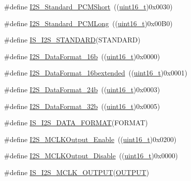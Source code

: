 \begin{DoxyCompactItemize}
\item 
\#define \hyperlink{group___i2_s___standard_gaaf59e587048ff632037dfc9875ab4c7b}{I2\+S\+\_\+\+Standard\+\_\+\+P\+C\+M\+Short}~((\hyperlink{_p_e___types_8h_a1f1825b69244eb3ad2c7165ddc99c956}{uint16\+\_\+t})0x0030)
\item 
\#define \hyperlink{group___i2_s___standard_gaf79cb88702059506d876dbd776d7a136}{I2\+S\+\_\+\+Standard\+\_\+\+P\+C\+M\+Long}~((\hyperlink{_p_e___types_8h_a1f1825b69244eb3ad2c7165ddc99c956}{uint16\+\_\+t})0x00\+B0)
\item 
\#define \hyperlink{group___i2_s___standard_ga826b9ddb34520b8fa64c2b65c9bfd528}{I\+S\+\_\+\+I2\+S\+\_\+\+S\+T\+A\+N\+D\+A\+RD}(S\+T\+A\+N\+D\+A\+RD)
\item 
\#define \hyperlink{group___i2_s___data___format_gabcd7cb799b68346a735709cc135bd414}{I2\+S\+\_\+\+Data\+Format\+\_\+16b}~((\hyperlink{_p_e___types_8h_a1f1825b69244eb3ad2c7165ddc99c956}{uint16\+\_\+t})0x0000)
\item 
\#define \hyperlink{group___i2_s___data___format_gae44b9704c9e393d5abec9bf4fcfe1116}{I2\+S\+\_\+\+Data\+Format\+\_\+16bextended}~((\hyperlink{_p_e___types_8h_a1f1825b69244eb3ad2c7165ddc99c956}{uint16\+\_\+t})0x0001)
\item 
\#define \hyperlink{group___i2_s___data___format_ga5a959486671cf00c5a734f1df205581b}{I2\+S\+\_\+\+Data\+Format\+\_\+24b}~((\hyperlink{_p_e___types_8h_a1f1825b69244eb3ad2c7165ddc99c956}{uint16\+\_\+t})0x0003)
\item 
\#define \hyperlink{group___i2_s___data___format_ga6be3bdcc713cb92a9ad247de013a5e37}{I2\+S\+\_\+\+Data\+Format\+\_\+32b}~((\hyperlink{_p_e___types_8h_a1f1825b69244eb3ad2c7165ddc99c956}{uint16\+\_\+t})0x0005)
\item 
\#define \hyperlink{group___i2_s___data___format_gac467da829eca4a5c4ce41a6abd2d8e81}{I\+S\+\_\+\+I2\+S\+\_\+\+D\+A\+T\+A\+\_\+\+F\+O\+R\+M\+AT}(F\+O\+R\+M\+AT)
\item 
\#define \hyperlink{group___i2_s___m_c_l_k___output_ga99713ee8c824f4d3bb25a9ce7bf5312a}{I2\+S\+\_\+\+M\+C\+L\+K\+Output\+\_\+\+Enable}~((\hyperlink{_p_e___types_8h_a1f1825b69244eb3ad2c7165ddc99c956}{uint16\+\_\+t})0x0200)
\item 
\#define \hyperlink{group___i2_s___m_c_l_k___output_gaea09824d7e6359924152277ed3661e7e}{I2\+S\+\_\+\+M\+C\+L\+K\+Output\+\_\+\+Disable}~((\hyperlink{_p_e___types_8h_a1f1825b69244eb3ad2c7165ddc99c956}{uint16\+\_\+t})0x0000)
\item 
\#define \hyperlink{group___i2_s___m_c_l_k___output_ga829ae526d1d11f14592e881f800fbb8a}{I\+S\+\_\+\+I2\+S\+\_\+\+M\+C\+L\+K\+\_\+\+O\+U\+T\+P\+UT}(\hyperlink{pins_8h_a77fecc1883f27c095012fbe56345c4dba2ab08d3e103968f5f4f26b66a52e99d6}{O\+U\+T\+P\+UT})

\end{DoxyCompactItemize}
